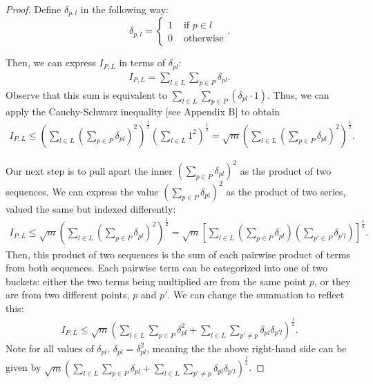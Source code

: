 \documentclass{scrippsthesisclass}
\theoremstyle{definition}
\begin{document}
\begin{proof}
    Define $\delta_{p,l}$ in the following way:
    \[
    \delta_{p,l} = \begin{cases}
        1 & \text{ if $p \in l$}\\
        0 & \text{ otherwise}
    \end{cases}.
    \]

Then, we can express $I_{P,L}$ in terms of $\delta_{pl}$: 
\begin{align}
I_{P, L} = \sum_{l \in L} \sum_{p \in P} \delta_{pl}. 
\end{align}
Observe that this sum is equivalent to $\sum \limits_{l \in L} \sum \limits_{p \in P} (\delta_{pl} \cdot 1)$. 
Thus, we can apply the Cauchy-Schwarz inequality [see Appendix B] to obtain
\begin{align}
I_{P, L} \leq \left(\sum_{l \in L}  \left(\sum_{p \in P} \delta_{pl} \right)^2 \right)^{\frac{1}{2}} \left( \sum_{l \in L} 1^2 \right)^{\frac{1}{2}} = \sqrt{m} \left(\sum_{l \in L}  \left(\sum_{p \in P} \delta_{pl} \right)^2 \right)^{\frac{1}{2}}.
\end{align}

Our next step is to pull apart the inner $\left(\sum \limits_{p \in P} \delta_{pl} \right)^2$ as the product of two sequences.
We can express the value $\left(\sum \limits_{p \in P} \delta_{pl} \right)^2$ as the product of two series, valued the same but indexed differently:
\begin{align}
I_{P, L} \leq \sqrt{m} \left(\sum_{l \in L}  \left(\sum_{p \in P} \delta_{pl} \right)^2 \right)^{\frac{1}{2}} = \sqrt{m} \left[\sum_{l \in L} \left( \sum_{p \in P} \delta_{pl} \right) \left( \sum_{p' \in P} \delta_{p'l} \right) \right]^{\frac{1}{2}}.
\end{align}
Then, this product of two sequences is the sum of each pairwise product of terms from both sequences. 
Each pairwise term can be categorized into one of two buckets: either the two terms being multiplied are from the same point $p$, or they are from two different points, $p$ and $p'$. 
We can change the summation to reflect this:
\begin{align}
I_{P, L} \leq \sqrt{m} \left( \sum_{l \in L} \sum_{p \in P} \delta_{pl}^2 + \sum_{l \in L} \sum_{p' \neq p} \delta_{pl} \delta_{p'l} \right)^{\frac{1}{2}}.
\end{align}
Note for all values of $\delta_{pl}$, $\delta_{pl} = \delta_{pl}^2$, meaning the the above right-hand side can be given by $\sqrt{m} \left( \sum \limits_{l \in L} \sum \limits_{p \in P} \delta_{pl} + \sum \limits_{l \in L} \sum \limits_{p' \neq p} \delta_{pl} \delta_{p'l} \right)^{\frac{1}{2}}$. 


\end{proof}
\end{document}
